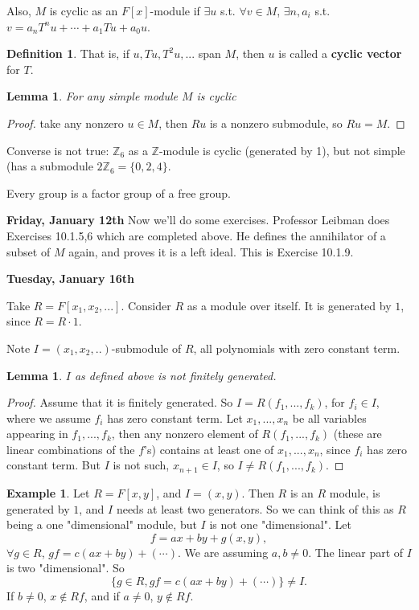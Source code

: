 \documentclass[9pt,reqno,twoside]{amsbook}
\theoremstyle{plain}
\numberwithin{section}{chapter}
\numberwithin{equation}{chapter}
\newtheorem{lem}[theorem]{Lemma}
\theoremstyle{definition}
\newtheorem{Def}[theorem]{Definition}
\newtheorem{Ex}[theorem]{Example}
\theoremstyle{remark}
\theoremstyle{plain}
\newcommand{\z}{\mathbb{Z}}
\begin{document}
Also, $M$ is cyclic as an $F[x]$-module if $\exists u$ s.t. $\forall v \in M$, $\exists n,a_i$ s.t. $v = a_nT^nu + \cdots + a_1Tu + a_0u$. 

\begin{Def}
That is, if $u,Tu,T^2u,...$ span $M$, then $u$ is called a \textbf{cyclic vector} for $T$. 
\end{Def}

\begin{lem}
For any simple module $M$ is cyclic
\end{lem}
\begin{proof}
 take any nonzero $u \in M$, then $Ru$ is a nonzero submodule, so $Ru = M$. 
\end{proof}

Converse is not true: $\z_6$ as a $\z$-module is cyclic (generated by 1), but not simple (has a submodule $2\z_6 = \{0,2,4\}$. 

Every group is a factor group of a free group. 

\vspace{3mm}
\textbf{Friday, January 12th}
Now we'll do some exercises. Professor Leibman does Exercises 10.1.5,6 which are completed above. He defines the annihilator of a subset of $M$ again, and proves it is a left ideal. This is Exercise 10.1.9. 

\textbf{Tuesday, January 16th}

Take $R = F[x_1,x_2,...]$. Consider $R$ as a module over itself. It is generated by $1$, since $R = R \cdot 1$. 

Note $I = (x_1,x_2,..)$-submodule of $R$, all polynomials with zero constant term. 

\begin{lem}
$I$ as defined above is not finitely generated. 
\end{lem}


\begin{proof}
Assume that it is finitely generated. So $I = R(f_1,...,f_k)$, for $f_i \in I$, where we assume $f_i$ has zero constant term.  Let $x_1,...,x_n$ be all variables appearing in $f_1,...,f_k$, then any nonzero element of $R(f_1,...,f_k)$ (these are linear combinations of the $f$'s) contains at least one of $x_1,...,x_n$, since $f_i$ has zero constant term. But $I$ is not such, $x_{n + 1} \in I$, so $I \neq R(f_1,...,f_k)$. 
\end{proof}

\begin{Ex}
Let $R = F[x,y]$, and $I = (x,y)$. Then $R$ is an $R$ module, is generated by $1$, and $I$ needs at least two generators. So we can think of this as $R$ being a one "dimensional" module, but $I$ is not one "dimensional". Let
$$
f = ax + by + g(x,y),
$$
$\forall g \in R$, $gf = c(ax + by) + (\cdots)$. We are assuming $a,b \neq 0$. The linear part of $I$ is two "dimensional". So
$$
\{g \in R, gf = c(ax + by) + (\cdots)\} \neq I. 
$$
If $b \neq 0$, $x \notin Rf$, and if $a \neq 0$, $y \notin Rf$. 
\end{Ex}
\end{document}
